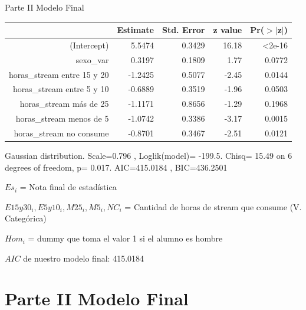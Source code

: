 \documentclass[pdf]{beamer}
\begin{document}
\begin{frame}{Parte II Modelo Final}

\begin{center}
\begin{small}
\begin{table}[ht]
\centering
\begin{tabular}{rrrrr}
 \hline
& Estimate & Std. Error & z value & Pr($>$$|$z$|$) \\
 \hline
(Intercept)                & 5.5474    & 0.3429& 16.18& <2e-16\\
sexo\_var                  & 0.3197 &    0.1809  & 1.77& 0.0772\\
horas\_stream entre 15 y 20 &-1.2425    & 0.5077 &-2.45& 0.0144\\
horas\_stream entre 5 y 10 & -0.6889   &  0.3519 &-1.96& 0.0503\\
horas\_stream más de 25   &  -1.1171    & 0.8656& -1.29& 0.1968\\
horas\_stream menos de 5   & -1.0742    & 0.3386& -3.17& 0.0015\\
horas\_stream no consume   & -0.8701    & 0.3467 &-2.51& 0.0121\\
    \hline
   \end{tabular}
   \end{table}
\tiny{Gaussian distribution. Scale=0.796 , Loglik(model)= -199.5. Chisq= 15.49 on 6 degrees of freedom, p= 0.017. AIC=415.0184 , BIC=436.2501 }
\end{small}
\end{center}   

\begin{center}
\begin{tiny}
\end{tiny}
\end{center}

\begin{small}

\(Es_i\) = Nota final de estadística

\(E15y30_i , E5y10_i , M25_i, M5_i , NC_i\) = Cantidad de horas de stream que consume (V. Categórica)

\(Hom_i\) = dummy que toma el valor 1 si el alumno es hombre

\(AIC\) de nuestro modelo final: 415.0184

\end{small}

\section{Parte II Modelo Final}

\end{frame}
\end{document}
